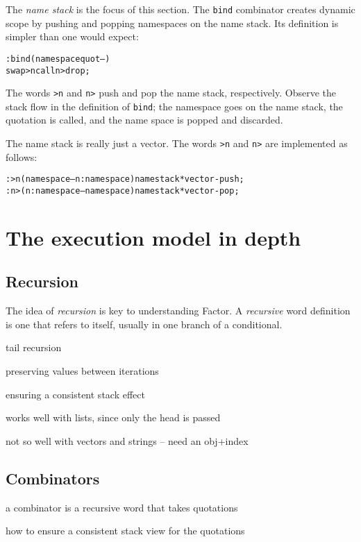 \documentclass[english]{article}
\begin{document}
The \emph{name stack} is the focus of this section. The \texttt{bind} combinator creates dynamic scope by pushing and popping namespaces on the name stack. Its definition is simpler than one would expect:

\begin{alltt}
: bind ( namespace quot -- )
    swap >n call n> drop ;
\end{alltt}

The words \texttt{>n} and \texttt{n>} push and pop the name stack, respectively. Observe the stack flow in the definition of \texttt{bind}; the namespace goes on the name stack, the quotation is called, and the name space is popped and discarded.

The name stack is really just a vector. The words \texttt{>n} and \texttt{n>} are implemented as follows:

\begin{alltt}
: >n ( namespace -- n:namespace ) namestack* vector-push ;
: n> ( n:namespace -- namespace ) namestack* vector-pop ;
\end{alltt}

\section{The execution model in depth}

\subsection{Recursion}

The idea of \emph{recursion} is key to understanding Factor. A \emph{recursive} word definition is one that refers to itself, usually in one branch of a conditional.


tail recursion

preserving values between iterations

ensuring a consistent stack effect

works well with lists, since only the head is passed

not so well with vectors and strings -- need an obj+index

\subsection{Combinators}

a combinator is a recursive word that takes quotations

how to ensure a consistent stack view for the quotations
\end{document}
